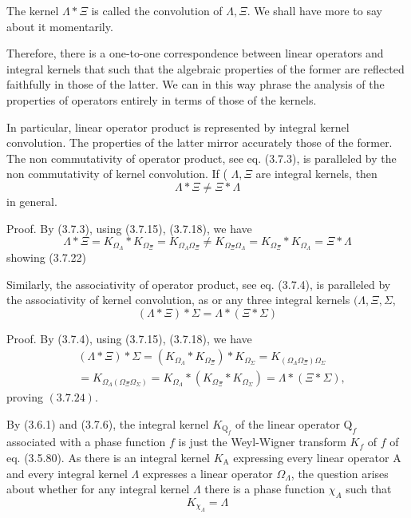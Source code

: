 \documentclass{article}
\begin{document}
The kernel $\Lambda * \Xi$ is called the convolution of $\Lambda, \Xi$. We shall have more to say about it momentarily.

Therefore, there is a one-to-one correspondence between linear operators and integral kernels that such that the algebraic properties of the former are reflected faithfully in those of the latter. We can in this way phrase the analysis of the properties of operators entirely in terms of those of the kernels.

In particular, linear operator product is represented by integral kernel convolution. The properties of the latter mirror accurately those of the former. The non commutativity of operator product, see eq. (3.7.3), is paralleled by the non commutativity of kernel convolution. If ( $\Lambda, \Xi$ are integral kernels, then
$$
\begin{equation*}
\Lambda * \Xi \neq \Xi * \Lambda \tag{3.7.22}
\end{equation*}
$$
in general.

Proof. By (3.7.3), using (3.7.15), (3.7.18), we have
$$
\begin{equation*}
\Lambda * \Xi=K_{\Omega_{\Lambda}} * K_{\Omega_{\Xi}}=K_{\Omega_{\Lambda} \Omega_{\Xi}} \neq K_{\Omega_{\Xi} \Omega_{\Lambda}}=K_{\Omega_{\Xi}} * K_{\Omega_{\Lambda}}=\Xi * \Lambda \tag{3.7.23}
\end{equation*}
$$
showing (3.7.22)

Similarly, the associativity of operator product, see eq. (3.7.4), is paralleled by the associativity of kernel convolution, as or any three integral kernels $(\Lambda, \Xi, \Sigma$,
$$
\begin{equation*}
(\Lambda * \Xi) * \Sigma=\Lambda *(\Xi * \Sigma) \tag{3.7.24}
\end{equation*}
$$

Proof. By (3.7.4), using (3.7.15), (3.7.18), we have
$$
\begin{align*}
& (\Lambda * \Xi) * \Sigma=\left(K_{\Omega_{\Lambda}} * K_{\Omega_{\Xi}}\right) * K_{\Omega_{\Sigma}}=K_{\left(\Omega_{\Lambda} \Omega_{\Xi}\right) \Omega_{\Sigma}}  \tag{3.7.25}\\
& =K_{\Omega_{\Lambda}\left(\Omega_{\Xi} \Omega_{\Sigma}\right)}=K_{\Omega_{\Lambda}} *\left(K_{\Omega_{\Xi}} * K_{\Omega_{\Sigma}}\right)=\Lambda *(\Xi * \Sigma),
\end{align*}
$$
proving $(3.7 .24)$.

By (3.6.1) and (3.7.6), the integral kernel $K_{\mathrm{Q}_{f}}$ of the linear operator $\mathrm{Q}_{f}$ associated with a phase function $f$ is just the Weyl-Wigner transform $K_{f}$ of $f$ of eq. (3.5.80). As there is an integral kernel $K_{\mathrm{A}}$ expressing every linear operator A and every integral kernel $\Lambda$ expresses a linear operator $\Omega_{\Lambda}$, the question arises about whether for any integral kernel $\Lambda$ there is a phase function $\chi_{A}$ such that
$$
\begin{equation*}
K_{\chi_{\Lambda}}=\Lambda \tag{3.7.26}
\end{equation*}
$$
\end{document}
